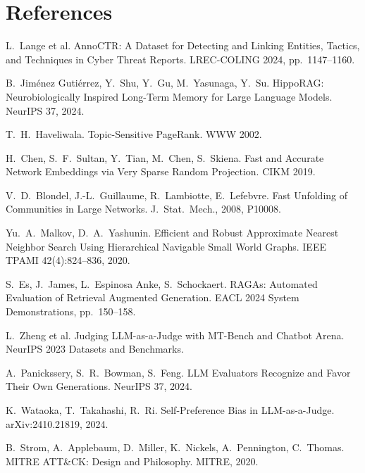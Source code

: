 \documentclass[10pt]{article}
\begin{document}
\section*{References}
{\footnotesize\begin{list}{}{\setlength{\leftmargin}{1.8em}\setlength{\labelwidth}{1.5em}\setlength{\labelsep}{0.3em}\setlength{\itemsep}{0pt}\setlength{\parsep}{0pt}\setlength{\topsep}{0pt}}
\item[{[1]}] L.\ Lange et al. AnnoCTR: A Dataset for Detecting and Linking Entities, Tactics, and Techniques in Cyber Threat Reports. LREC-COLING 2024, pp.\ 1147--1160.
\item[{[2]}] B.\ Jiménez Gutiérrez, Y.\ Shu, Y.\ Gu, M.\ Yasunaga, Y.\ Su. HippoRAG: Neurobiologically Inspired Long-Term Memory for Large Language Models. NeurIPS 37, 2024.
\item[{[3]}] T.\ H.\ Haveliwala. Topic-Sensitive PageRank. WWW 2002.
\item[{[4]}] H.\ Chen, S.\ F.\ Sultan, Y.\ Tian, M.\ Chen, S.\ Skiena. Fast and Accurate Network Embeddings via Very Sparse Random Projection. CIKM 2019.
\item[{[5]}] V.\ D.\ Blondel, J.-L.\ Guillaume, R.\ Lambiotte, E.\ Lefebvre. Fast Unfolding of Communities in Large Networks. J.\ Stat.\ Mech., 2008, P10008.
\item[{[6]}] Yu.\ A.\ Malkov, D.\ A.\ Yashunin. Efficient and Robust Approximate Nearest Neighbor Search Using Hierarchical Navigable Small World Graphs. IEEE TPAMI 42(4):824--836, 2020.
\item[{[7]}] S.\ Es, J.\ James, L.\ Espinosa Anke, S.\ Schockaert. RAGAs: Automated Evaluation of Retrieval Augmented Generation. EACL 2024 System Demonstrations, pp.\ 150--158.
\item[{[8]}] L.\ Zheng et al. Judging LLM-as-a-Judge with MT-Bench and Chatbot Arena. NeurIPS 2023 Datasets and Benchmarks.
\item[{[9]}] A.\ Panickssery, S.\ R.\ Bowman, S.\ Feng. LLM Evaluators Recognize and Favor Their Own Generations. NeurIPS 37, 2024.
\item[{[10]}] K.\ Wataoka, T.\ Takahashi, R.\ Ri. Self-Preference Bias in LLM-as-a-Judge. arXiv:2410.21819, 2024.
\item[{[11]}] B.\ Strom, A.\ Applebaum, D.\ Miller, K.\ Nickels, A.\ Pennington, C.\ Thomas. MITRE ATT\&CK: Design and Philosophy. MITRE, 2020.
\end{list}}
\end{document}
